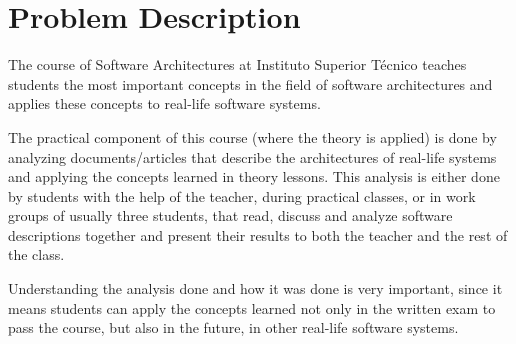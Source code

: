 
\section{Problem Description}
\label{chapter:problemdescription}
The course of Software Architectures at Instituto Superior T\'{e}cnico teaches students the most important concepts in the field of software architectures and applies these concepts to real-life software systems.

The practical component of this course (where the theory is applied) is done by analyzing documents/articles that describe the architectures of real-life systems and applying the concepts learned in theory lessons.
This analysis is either done by students with the help of the teacher, during practical classes, or in work groups of usually three students, that read, discuss and analyze software descriptions together and present their results to both the teacher and the rest of the class.

Understanding the analysis done and how it was done is very important, since it means students can apply the concepts learned not only in the written exam to pass the course, but also in the future, in other real-life software systems.

